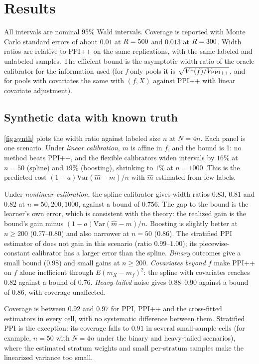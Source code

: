 \section{Results}
\label{sec:results}

All intervals are nominal 95\% Wald intervals. Coverage is reported with Monte Carlo standard errors of about $0.01$ at $R=500$ and $0.013$ at $R=300$. Width ratios are relative to PPI++ on the same replications, with the same labeled and unlabeled samples. The efficient bound is the asymptotic width ratio of the oracle calibrator for the information used (for \emph{f}-only pools it is $\sqrt{V^\star(f)/V_{\rm PPI++}}$, and for pools with covariates the same with $(f,X)$ against PPI++ with linear covariate adjustment).

\subsection{Synthetic data with known truth}

\cref{fig:synth} plots the width ratio against labeled size $n$ at $N=4n$. Each panel is one scenario. Under \emph{linear calibration}, $m$ is affine in $f$, and the bound is 1: no method beats PPI++, and the flexible calibrators widen intervals by $16\%$ at $n=50$ (spline) and $19\%$ (boosting), shrinking to $1\%$ at $n=1000$. This is the predicted cost $(1-a)\mathrm{Var}(\hat m-m)/n$ with $\hat m$ estimated from few labels.

Under \emph{nonlinear calibration}, the spline calibrator gives width ratios $0.83$, $0.81$ and $0.82$ at $n=50,200,1000$, against a bound of $0.756$. The gap to the bound is the learner's own error, which is consistent with the theory: the realized gain is the bound's gain minus $(1-a)\mathrm{Var}(\hat m-m)/n$. Boosting is slightly better at $n\ge200$ ($0.77$--$0.80$) and also narrower at $n=50$ ($0.86$). The stratified PPI estimator of \citet{fisch2024strat} does not gain in this scenario (ratio $0.99$--$1.00$); its piecewise-constant calibrator has a larger error than the spline. \emph{Binary} outcomes give a small bound (0.98) and small gains at $n\ge200$. \emph{Covariates beyond $f$} make PPI++ on $f$ alone inefficient through $E(m_X-m_f)^2$: the spline with covariates reaches $0.82$ against a bound of $0.76$. \emph{Heavy-tailed} noise gives 0.88--0.90 against a bound of 0.86, with coverage unaffected.

Coverage is between $0.92$ and $0.97$ for PPI, PPI++ and the cross-fitted estimators in every cell, with no systematic difference between them. Stratified PPI is the exception: its coverage falls to $0.91$ in several small-sample cells (for example, $n=50$ with $N=4n$ under the binary and heavy-tailed scenarios), where the estimated stratum weights and small per-stratum samples make the linearized variance too small.

